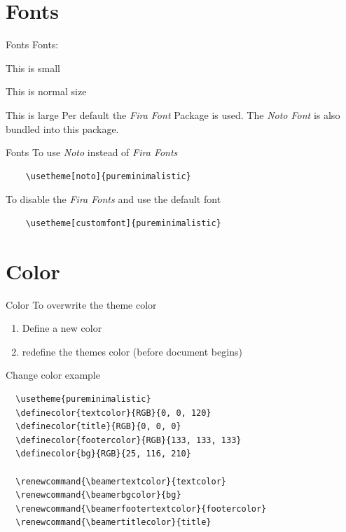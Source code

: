 \documentclass[aspectratio=169]{beamer}
\begin{document}
\section{Fonts}
\begin{frame}[fragile]{Fonts}
	Fonts:

	{\small This is small}

	This is normal size

		{\large This is large}
	\vfill
	Per default the \emph{Fira Font} Package is
	used. The \emph{Noto Font} is also bundled into this
	package.
\end{frame}

\begin{frame}[fragile]{Fonts}
	To use \emph{Noto} instead of \emph{Fira Fonts}
	\begin{verbatim}
    \usetheme[noto]{pureminimalistic}
  \end{verbatim}
	\vfill
	To disable the \emph{Fira Fonts} and use the default font
	\begin{verbatim}
    \usetheme[customfont]{pureminimalistic}
  \end{verbatim}
\end{frame}

\section{Color}
\begin{frame}[fragile]{Color}
	To overwrite the theme color
	\begin{enumerate}
		\item Define a new color
		\item redefine the themes color (before document begins)
	\end{enumerate}
\end{frame}

\begin{frame}[fragile]{Change color example}
	\small
	\begin{verbatim}
  \usetheme{pureminimalistic}
  \definecolor{textcolor}{RGB}{0, 0, 120}
  \definecolor{title}{RGB}{0, 0, 0}
  \definecolor{footercolor}{RGB}{133, 133, 133}
  \definecolor{bg}{RGB}{25, 116, 210}

  \renewcommand{\beamertextcolor}{textcolor}
  \renewcommand{\beamerbgcolor}{bg}
  \renewcommand{\beamerfootertextcolor}{footercolor}
  \renewcommand{\beamertitlecolor}{title}
  \end{verbatim}
\end{frame}
\end{document}
